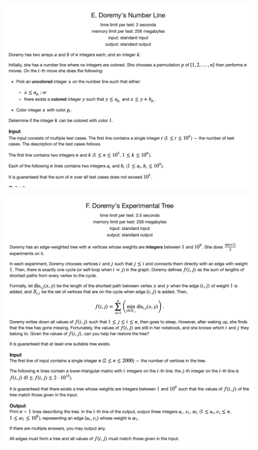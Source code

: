 \documentclass[11pt]{scrartcl}
\begin{document}
\includegraphics[width=\textwidth,height=0.7\textheight]{CF3}

\includegraphics[width=\textwidth,height=0.7\textheight]{CF4}
\end{document}
